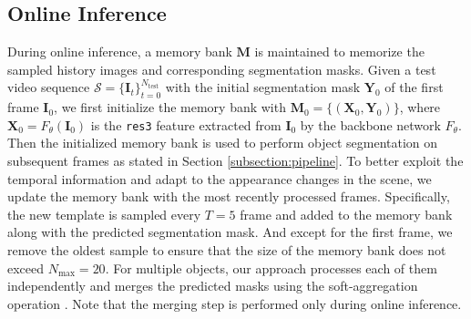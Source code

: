 \documentclass[10pt,twocolumn,letterpaper]{article}
\begin{document}
\subsection{Online Inference}\label{subsection:inference}
During online inference, a memory bank $\mathbf{M}$ is maintained to memorize the sampled history images and corresponding segmentation masks. Given a test video sequence $\mathcal{S} = \{\mathbf{I}_t\}_{t=0}^{N_{\text{test}}}$ with the initial segmentation mask $\mathbf{Y}_0$ of the first frame $\mathbf{I}_0$, we first initialize the memory bank with $\mathbf{M}_0 = \{(\mathbf{X}_0, \mathbf{Y}_0)\}$, where $\mathbf{X}_0 = F_{\theta}(\mathbf{I}_0)$ is the \texttt{res3} feature extracted from $\mathbf{I}_0$ by the backbone network $F_{\theta}$. Then the initialized memory bank is used to perform object segmentation on subsequent frames as stated in Section \ref{subsection:pipeline}. To better exploit the temporal information and adapt to the appearance changes in the scene, we update the memory bank with the most recently processed frames. Specifically, the new template is sampled every $T =5$ frame and added to the memory bank along with the predicted segmentation mask. And except for the first frame, we remove the oldest sample to ensure that the size of the memory bank does not exceed $N_{\text{max}}=20$. For multiple objects, our approach processes each of them independently and merges the predicted masks using the soft-aggregation operation \cite{rgmp2018A}. Note that the merging step is performed only during online inference.
\end{document}

